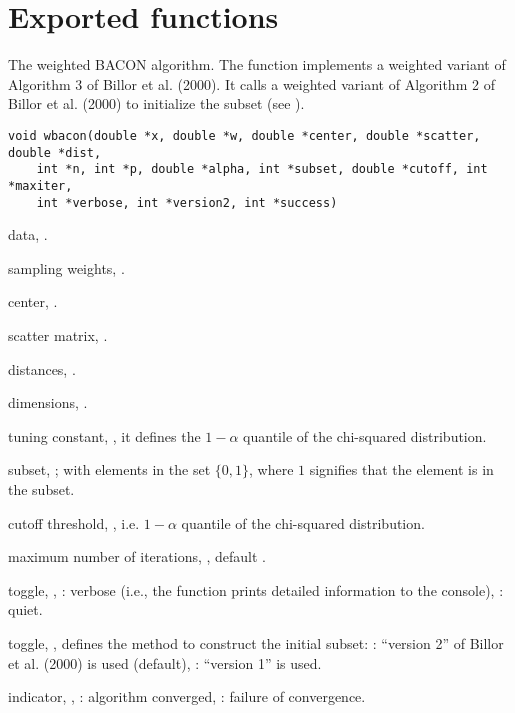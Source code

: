 \documentclass[a4paper,oneside,10pt,DIV=12]{scrreprt}
\begin{document}
\chapter{Exported functions}

\begin{Description}
The weighted BACON algorithm. The function implements a weighted variant of 
Algorithm 3 of Billor et al. (2000). It calls a weighted variant of 
Algorithm 2 of Billor et al. (2000) to initialize the subset (see
). 
\end{Description}
\begin{Usage}
\begin{verbatim}
void wbacon(double *x, double *w, double *center, double *scatter, double *dist,
    int *n, int *p, double *alpha, int *subset, double *cutoff, int *maxiter,
    int *verbose, int *version2, int *success)
\end{verbatim}
\end{Usage}
\begin{Arguments}
	\begin{ldescription}
		\item[\code{x}] data, .
		\item[\code{w}] sampling weights, .
		\item[\code{center}] center, .
		\item[\code{scatter}] scatter matrix, .
		\item[\code{dist}] distances, .
		\item[\code{n, p}] dimensions, \code{[int]}.
		\item[\code{alpha}] tuning constant, \code{[double]}, it defines the 
			$1-\alpha$ quantile of the chi-squared distribution.
		\item[\code{subset}] subset, ; with elements in the
			set $\{0, 1\}$, where $1$ signifies that the element is in the 
			subset.
		\item[\code{cutoff}] cutoff threshold, \code{[double]}, i.e. $1-\alpha$
			quantile of the chi-squared distribution.
		\item[\code{maxiter}] maximum number of iterations, \code{[int]}, 
			default .
		\item[\code{verbose}] toggle, \code{[int]}, : verbose (i.e., the
			function prints detailed information to the console), :
			quiet.
		\item[\code{version2}] toggle, \code{[int]}, defines the method to
			construct the initial subset: : ``version 2'' of Billor et
			al. (2000) is used (default), : ``version 1'' is used.
		\item[\code{success}] indicator, \code{[int]}, : algorithm 
			converged, : failure of convergence.
	\end{ldescription}
\end{Arguments}
\end{document}
